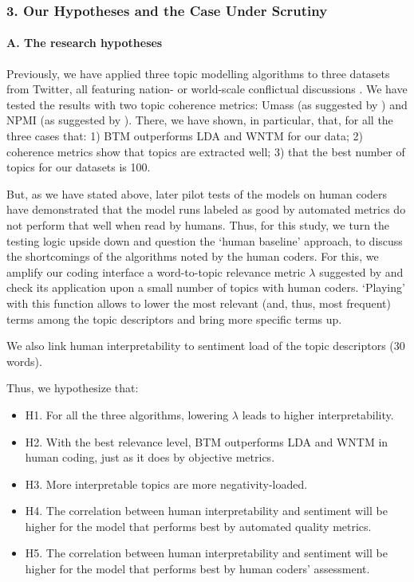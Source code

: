 \subsubsection{3. Our Hypotheses and the Case Under Scrutiny}

\paragraph{A. The research hypotheses}
Previously, we have applied three topic modelling algorithms to three datasets from Twitter, all featuring nation- or world-scale conflictual discussions \cite{BlekanovTarasovMaksimov}. We have tested the results with two topic coherence metrics: Umass (as suggested by \cite{MimnoWallachTalley}) and NPMI (as suggested by \cite{StevesonAletras}). There, we have shown, in particular, that, for all the three cases that: 1) BTM outperforms LDA and WNTM for our data; 2) coherence metrics show that topics are extracted well; 3) that the best number of topics for our datasets is 100.

But, as we have stated above, later pilot tests of the models on human coders have demonstrated that the model runs labeled as good by automated metrics do not perform that well when read by humans. Thus, for this study, we turn the testing logic upside down and question the ‘human baseline’ approach, to discuss the shortcomings of the algorithms noted by the human coders. For this, we amplify our coding interface a word-to-topic relevance metric \(\lambda\) suggested by \cite{SievertShirley} and check its application upon a small number of topics with human coders. ‘Playing’ with this function allows to lower the most relevant (and, thus, most frequent) terms among the topic descriptors and bring more specific terms up.

We also link human interpretability to sentiment load of the topic descriptors (30 words).

Thus, we hypothesize that:
\begin{itemize}
	\item H1. For all the three algorithms, lowering \(\lambda\) leads to higher interpretability.
	\item H2. With the best relevance level, BTM outperforms LDA and WNTM in human coding, just as it does by objective metrics.
	\item H3. More interpretable topics are more negativity-loaded.
	\item H4. The correlation between human interpretability and sentiment will be higher for the model that performs best by automated quality metrics.
	\item H5. The correlation between human interpretability and sentiment will be higher for the model that performs best by human coders’ assessment.
\end{itemize}

